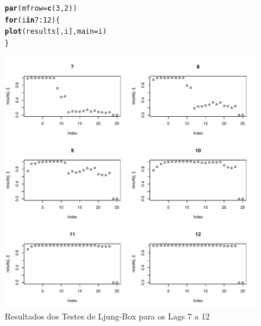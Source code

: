 \documentclass{article}\usepackage[]{graphicx}\usepackage[]{color}
\makeatletter
\def\maxwidth{ %
  \ifdim\Gin@nat@width>\linewidth
    \linewidth
  \else
    \Gin@nat@width
  \fi
}
\newcommand{\hlnum}[1]{\textcolor[rgb]{0.686,0.059,0.569}{#1}}%
\newcommand{\hlopt}[1]{\textcolor[rgb]{0,0,0}{#1}}%
\newcommand{\hlstd}[1]{\textcolor[rgb]{0.345,0.345,0.345}{#1}}%
\newcommand{\hlkwa}[1]{\textcolor[rgb]{0.161,0.373,0.58}{\textbf{#1}}}%
\newcommand{\hlkwc}[1]{\textcolor[rgb]{0.333,0.667,0.333}{#1}}%
\newcommand{\hlkwd}[1]{\textcolor[rgb]{0.737,0.353,0.396}{\textbf{#1}}}%
\newenvironment{kframe}{%
 \def\at@end@of@kframe{}%
 \ifinner\ifhmode%
  \def\at@end@of@kframe{\end{minipage}}%
  \begin{minipage}{\columnwidth}%
 \fi\fi%
 \def\FrameCommand##1{\hskip\@totalleftmargin \hskip-\fboxsep
 \colorbox{shadecolor}{##1}\hskip-\fboxsep
     \hskip-\linewidth \hskip-\@totalleftmargin \hskip\columnwidth}%
 \MakeFramed {\advance\hsize-\width
   \@totalleftmargin\z@ \linewidth\hsize
   \@setminipage}}%
 {\par\unskip\endMakeFramed%
 \at@end@of@kframe}
\newenvironment{knitrout}{}{} %
\makeatother
\begin{document}
            \begin{figure}[H]
            \caption{Resultados dos Testes de Ljung-Box para os Lags 7 a 12}
            \centering
\begin{knitrout}
\color{fgcolor}\begin{kframe}
\begin{alltt}
\hlkwd{par}\hlstd{(}\hlkwc{mfrow} \hlstd{=} \hlkwd{c}\hlstd{(}\hlnum{3}\hlstd{,}\hlnum{2}\hlstd{))}
\hlkwa{for} \hlstd{(i} \hlkwa{in} \hlnum{7}\hlopt{:}\hlnum{12}\hlstd{)\{}
  \hlkwd{plot}\hlstd{(results[,i],} \hlkwc{main}\hlstd{=i)}
\hlstd{\}}
\end{alltt}
\end{kframe}
\includegraphics[width=\maxwidth]{figure/unnamed-chunk-47-1} 

\end{knitrout}
            \end{figure}
            
\end{document}
